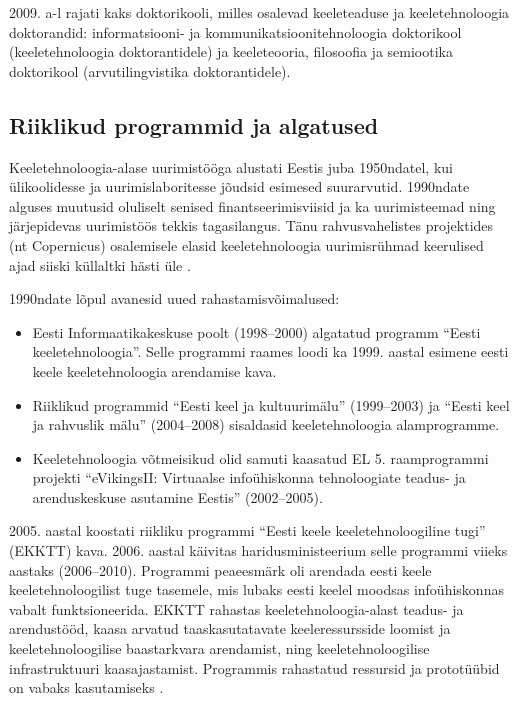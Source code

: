 \begin{multicols}{2}
2009. a-l rajati kaks doktorikooli, milles osalevad keeleteaduse ja keele\-tehnoloogia doktorandid: informatsiooni- ja kommu\-ni\-kat\-siooni\-tehnoloogia doktorikool (keele\-tehnoloogia doktorantidele) ja keele\-teooria, filosoofia ja semiootika doktorikool (arvutilingvistika doktorantidele).

\subsection{Riiklikud programmid ja algatused}

Keeletehnoloogia-alase uurimistööga alustati Eestis juba 1950ndatel, kui ülikoolidesse ja uurimislaboritesse jõudsid esimesed suurarvutid. 
1990ndate alguses muutusid oluliselt senised finantseerimisviisid ja ka uurimisteemad ning järjepidevas uurimistöös tekkis tagasilangus. 
Tänu rahvusvahelistes projektides (nt Copernicus) osalemisele elasid keeletehnoloogia uurimisrühmad keerulised ajad siiski küllaltki hästi üle \cite{Meisteretal}.

1990ndate lõpul avanesid uued rahastamisvõimalused:
\begin{itemize}
 \item Eesti Informaatikakeskuse poolt (1998--2000) algatatud programm ``Eesti keeletehnoloogia''. Selle programmi raames loodi ka 1999. aastal esimene eesti keele keeletehnoloogia arendamise kava. 
 \item Riiklikud programmid ``Eesti keel ja kultuurimälu''
   (1999--2003) ja ``Eesti keel ja rahvuslik mälu'' (2004--2008)
   sisaldasid keeletehnoloogia alamprogramme. 
 \item Keeletehnoloogia võtmeisikud olid samuti kaasatud EL 5. raam\-prog\-rammi projekti ``eVikingsII: Virtuaalse infoühiskonna tehnoloogiate teadus- ja arenduskeskuse asutamine Eestis'' (2002--2005).
\end{itemize}

2005. aastal koostati riikliku programmi ``Eesti keele keeletehnoloogiline tugi'' (EKKTT) kava. 
2006. aastal käivitas haridusministeerium selle programmi viieks
aastaks (2006--2010).  
Programmi peaeesmärk oli arendada eesti keele keeletehnoloogilist tuge tasemele, mis lubaks eesti keelel moodsas infoühiskonnas vabalt funktsioneerida. 
EKKTT rahastas keeletehnoloogia-alast teadus- ja arendustööd, kaasa arvatud taaskasutatavate keeleressursside loomist ja keeletehnoloogilise baastarkvara arendamist, ning keeletehnoloogilise infrastruktuuri kaasajastamist. 
Programmis rahastatud ressursid ja prototüübid on vabaks kasutamiseks \cite{ekktt}.


\end{multicols}
